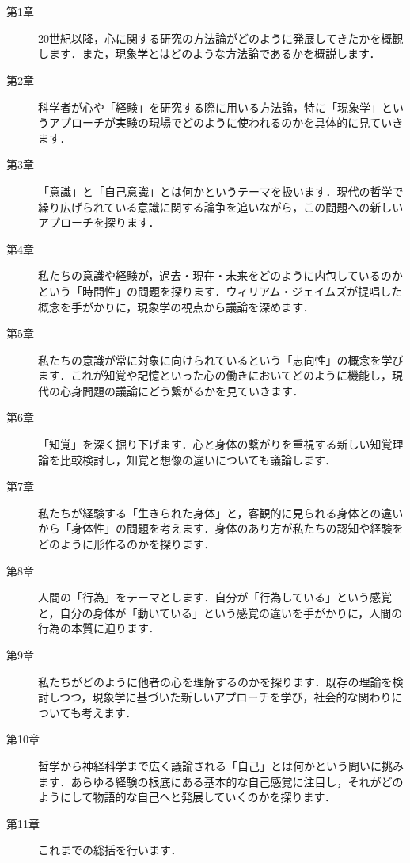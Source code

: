 \documentclass[b5j]{ltjsarticle}
\begin{document}
\section{}

\begin{description}
  \item[第1章] 20世紀以降，心に関する研究の方法論がどのように発展してきたかを概観します．また，現象学とはどのような方法論であるかを概説します．
  \item[第2章] 科学者が心や「経験」を研究する際に用いる方法論，特に「現象学」というアプローチが実験の現場でどのように使われるのかを具体的に見ていきます．
  \item[第3章] 「意識」と「自己意識」とは何かというテーマを扱います．現代の哲学で繰り広げられている意識に関する論争を追いながら，この問題への新しいアプローチを探ります．
  \item[第4章] 私たちの意識や経験が，過去・現在・未来をどのように内包しているのかという「時間性」の問題を探ります．ウィリアム・ジェイムズが提唱した概念を手がかりに，現象学の視点から議論を深めます．
  \item[第5章] 私たちの意識が常に対象に向けられているという「志向性」の概念を学びます．これが知覚や記憶といった心の働きにおいてどのように機能し，現代の心身問題の議論にどう繋がるかを見ていきます．
  \item[第6章] 「知覚」を深く掘り下げます．心と身体の繋がりを重視する新しい知覚理論を比較検討し，知覚と想像の違いについても議論します．
  \item[第7章] 私たちが経験する「生きられた身体」と，客観的に見られる身体との違いから「身体性」の問題を考えます．身体のあり方が私たちの認知や経験をどのように形作るのかを探ります．
  \item[第8章] 人間の「行為」をテーマとします．自分が「行為している」という感覚と，自分の身体が「動いている」という感覚の違いを手がかりに，人間の行為の本質に迫ります．
  \item[第9章] 私たちがどのように他者の心を理解するのかを探ります．既存の理論を検討しつつ，現象学に基づいた新しいアプローチを学び，社会的な関わりについても考えます．
  \item[第10章] 哲学から神経科学まで広く議論される「自己」とは何かという問いに挑みます．あらゆる経験の根底にある基本的な自己感覚に注目し，それがどのようにして物語的な自己へと発展していくのかを探ります．
  \item[第11章] これまでの総括を行います．
\end{description}
\end{document}
